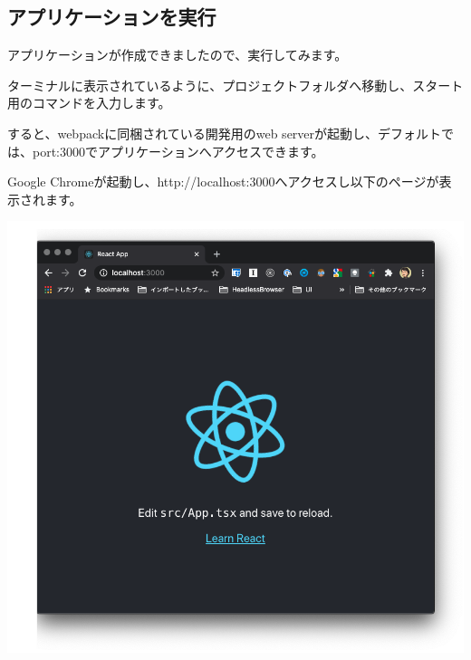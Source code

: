 \subsection{アプリケーションを実行}
\keeplastskip{
  \label{sec:2-1-1}
  \label{sec-02yarnstart}
  \par\nobreak
}

アプリケーションが作成できましたので、実行してみます。

ターミナルに表示されているように、プロジェクトフォルダへ移動し、スタート用のコマンドを入力します。

\def\startercodeblockfontsize{}
\begin{starterterminal}[]{}\end{starterterminal}

すると、webpackに同梱されている開発用のweb serverが起動し、デフォルトでは、port:3000でアプリケーションへアクセスできます。

\def\startercodeblockfontsize{}
\begin{starterterminal}[]{}\end{starterterminal}

Google Chromeが起動し、http://localhost:3000へアクセスし以下のページが表示されます。

\begin{reviewimage}[H]%
\includegraphics[width=1.0\maxwidth]{./images/02-create-react-app/02_cra_start.png}%
\label{image:02-create-react-app:02_cra_start}
\end{reviewimage}


